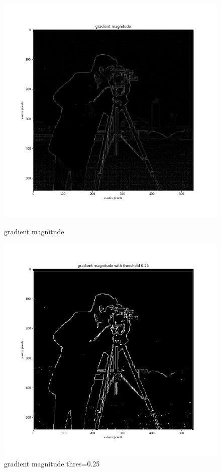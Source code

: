 \documentclass{article}
\begin{document}
\begin{figure}[!htb]
    \includegraphics[width=\linewidth]{gradient magnitude.png}
    \caption{gradient magnitude}\label{fig:awesome_image1}
\endminipage
{}
    \includegraphics[width=\linewidth]{gradient magnitude threshold.png}
    \caption{gradient magnitude thres=0.25}\label{fig:awesome_image2}
\endminipage
\end{figure}
\FloatBarrier
\end{document}
